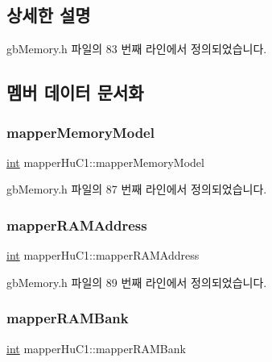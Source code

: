 \subsection{상세한 설명}


gb\+Memory.\+h 파일의 83 번째 라인에서 정의되었습니다.



\subsection{멤버 데이터 문서화}
\mbox{\label{structmapper_hu_c1_a22afbac167276896703576f5e237f141}} 
\subsubsection{\texorpdfstring{mapper\+Memory\+Model}{mapperMemoryModel}}
{\footnotesize\ttfamily \mbox{\hyperlink{_util_8cpp_a0ef32aa8672df19503a49fab2d0c8071}{int}} mapper\+Hu\+C1\+::mapper\+Memory\+Model}



gb\+Memory.\+h 파일의 87 번째 라인에서 정의되었습니다.

\mbox{\label{structmapper_hu_c1_af122d3984f260f428d007fa095d2df27}} 
\subsubsection{\texorpdfstring{mapper\+R\+A\+M\+Address}{mapperRAMAddress}}
{\footnotesize\ttfamily \mbox{\hyperlink{_util_8cpp_a0ef32aa8672df19503a49fab2d0c8071}{int}} mapper\+Hu\+C1\+::mapper\+R\+A\+M\+Address}



gb\+Memory.\+h 파일의 89 번째 라인에서 정의되었습니다.

\mbox{\label{structmapper_hu_c1_a0199405980430215b615fa9fd3e46a19}} 
\subsubsection{\texorpdfstring{mapper\+R\+A\+M\+Bank}{mapperRAMBank}}
{\footnotesize\ttfamily \mbox{\hyperlink{_util_8cpp_a0ef32aa8672df19503a49fab2d0c8071}{int}} mapper\+Hu\+C1\+::mapper\+R\+A\+M\+Bank}



